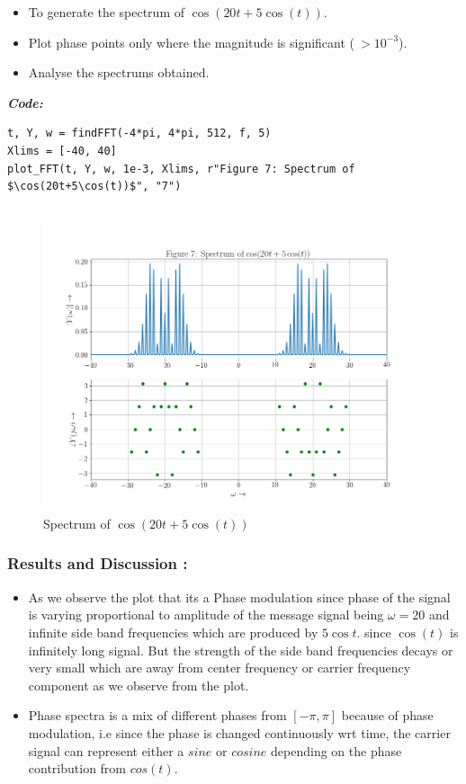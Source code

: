 \documentclass[11pt, a4paper]{article}
\begin{document}
 \begin{itemize}
 
 \item
   To generate the spectrum of \(\cos(20t +5\cos(t))\).
 \item
   Plot phase points only where the magnitude is significant
   (\(\ > 10^{-3}\)).
 \item
   Analyse the spectrums obtained.
 \end{itemize}
\textit{\textbf{Code:}}
\begin{lstlisting}
t, Y, w = findFFT(-4*pi, 4*pi, 512, f, 5)
Xlims = [-40, 40]
plot_FFT(t, Y, w, 1e-3, Xlims, r"Figure 7: Spectrum of $\cos(20t+5\cos(t))$", "7")
  
\end{lstlisting}
\newpage
\begin{figure}[!tbh]
  \centering
  \includegraphics[scale=0.5]{./../Extras/fig9-7.png}  %
  \caption{Spectrum of $\cos(20t+5\cos(t))$}
\end{figure}

\newpage
\subsubsection{Results and Discussion :}\label{results-and-discussion}

\begin{itemize}

\item
  As we observe the plot that its a Phase modulation since phase of the
  signal is varying proportional to amplitude of the message signal
  being \(\omega = 20\) and infinite side band frequencies which are
  produced by \(5\cos t\). since \(\cos(t)\) is infinitely long signal.
  But the strength of the side band frequencies decays or very small
  which are away from center frequency or carrier frequency component as
  we observe from the plot.
\item
  Phase spectra is a mix of different phases from \([-\pi,\pi]\) because
  of phase modulation, i.e since the phase is changed continuously wrt
  time, the carrier signal can represent either a \(sine\) or \(cosine\)
  depending on the phase contribution from \(cos(t)\).
\end{itemize}
\end{document}
